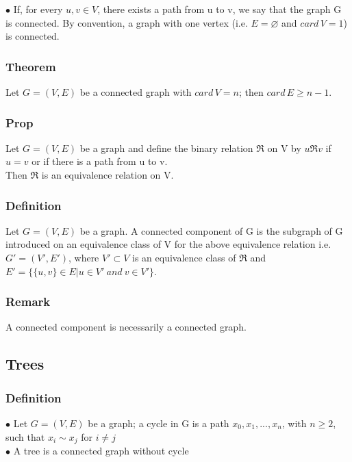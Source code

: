                 \noindent$\bullet$ If, for every $u,v\in V$, there exists a path from u to v, we say that the graph G is connected. By convention, a graph with one vertex (i.e. $E=\varnothing$ and $card\, V=1$) is connected.

            \subsubsection{Theorem}
                Let $G=(V,E)$ be a connected graph with $card\, V=n$; then $card\, E\geq n-1$.

            \subsubsection{Prop}
                Let $G=(V,E)$ be a graph and define the binary relation $\mathfrak{R}$ on V by $u\mathfrak{R}v$ if $u=v$ or if there is a path from u to v. \\ Then $\mathfrak{R}$ is an equivalence relation on V.

            \subsubsection{Definition}
                Let $G=(V,E)$ be a graph. A connected component of G is the subgraph of G introduced on an equivalence class of V for the above equivalence relation i.e. $G'=(V',E')$, where $V' \subset V$ is an equivalence class of $\mathfrak{R}$ and $E'=\{\{u,v\}\in E | u\in V' \: and\: v\in V'\}$.

            \subsubsection{Remark}
                A connected component is necessarily a connected graph.

        \subsection{Trees}
            \subsubsection{Definition}
                $\bullet$ Let $G=(V,E)$ be a graph; a cycle in G is a path $x_0,x_1,...,x_n$, with $n\geq 2$, such that $x_i\sim x_j$ for $i\neq j$ \\
                $\bullet$ A tree is a connected graph without cycle

